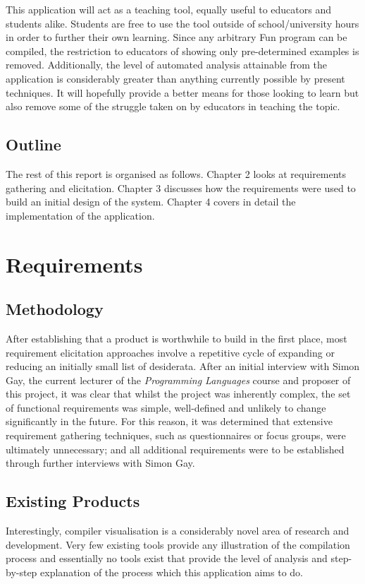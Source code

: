 \documentclass{l4proj}
\begin{document}
This application will act as a teaching tool, equally useful to educators and students alike. Students are free to use the tool outside of school/university hours in order to further their own learning. Since any arbitrary Fun program can be compiled, the restriction to educators of showing only pre-determined examples is removed. Additionally, the level of automated analysis attainable from the application is considerably greater than anything currently possible by present techniques. It will hopefully provide a better means for those looking to learn but also remove some of the struggle taken on by educators in teaching the topic.

\section{Outline}
The rest of this report is organised as follows. Chapter 2 looks at requirements gathering and elicitation. Chapter 3 discusses how the requirements were used to build an initial design of the system. Chapter 4 covers in detail the implementation of the application.

\chapter{Requirements}
\section{Methodology} 
After establishing that a product is worthwhile to build in the first place, most requirement elicitation approaches involve a repetitive cycle of expanding or reducing an initially small list of desiderata. After an initial interview with Simon Gay, the current lecturer of the {\it Programming Languages} course and proposer of this project, it was clear that whilst the project was inherently complex, the set of functional requirements was simple, well-defined and unlikely to change significantly in the future. For this reason, it was determined that extensive requirement gathering techniques, such as questionnaires or focus groups, were ultimately unnecessary; and all additional requirements were to be established through further interviews with Simon Gay.

\section{Existing Products}
Interestingly, compiler visualisation is a considerably novel area of research and development. Very few existing tools provide any illustration of the compilation process and essentially no tools exist that provide the level of analysis and step-by-step explanation of the process which this application aims to do. 
\end{document}
